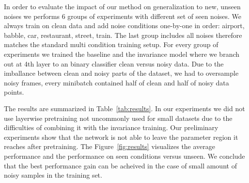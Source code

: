 \documentclass{article}
\begin{document}
In order to evaluate the impact of our method on generalization to new, unseen noises 
we performs 6 groups of experiments with different set of seen noises. We always train
on clean data and add noise conditions one-by-one in order: airport, babble, car, 
restaurant, street, train. The last group includes all noises therefore matches the
standard multi condition training setup. For every group of experiments we trained the
baseline and the invariance model where we branch out at 4th layer to an  
binary classifier clean versus noisy data. Due to the imballance between clean and
noisy parts of the dataset, we had to oversample noisy frames, every minibatch contained
half of clean and half of noisy data points.

The results are summarized in Table~\ref{tab:results}. 
In our experiments we did not use layerwise pretraining not uncommonly used for small
datasets due to the difficulties of combining it with the invariance training. Our preliminary
experiments show that the network is not able to leave the parameter region it reaches after 
pretraining. The Figure~\ref{fig:results} visualizes the average performance and the
performance on seen conditions versus unseen. We conclude that the best performance
gain can be acheived in the case of small amount of noisy samples in the training set.
\end{document}
